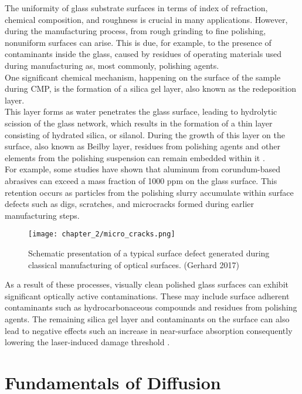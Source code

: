 The uniformity of glass substrate surfaces in terms of index of refraction, chemical composition, and roughness is crucial in many applications. However, during the manufacturing process, from rough grinding to fine polishing, nonuniform surfaces can arise. This is due, for example, to the presence of contaminants inside the glass, caused by residues of operating materials used during manufacturing as, most commonly, polishing agents.
\\
One significant chemical mechanism, happening on the surface of the sample during CMP, is the formation of a silica gel layer, also known as the redeposition layer.
\\
This layer forms as water penetrates the glass surface, leading to hydrolytic scission of the glass network, which results in the formation of a thin layer consisting of hydrated silica, or silanol. During the growth of this layer on the surface, also known as Beilby layer, residues from polishing agents and other elements from the polishing suspension can remain embedded within it \cite{suratwalaChemistryFormationBeilby2015}.
\\
For example, some studies \cite{kozlowskiDepthProfilingPolishinginduced1998} have shown that aluminum from corundum-based abrasives can exceed a mass fraction of 1000 ppm on the glass surface. This retention occurs as particles from the polishing slurry accumulate within surface defects such as digs, scratches, and microcracks formed during earlier manufacturing steps.

\begin{figure}[H]
    \centering
    \texttt{[image: chapter\_2/micro\_cracks.png]}
    \caption[Schematic of a surface defect generated during optics manufacturing.]{ Schematic presentation of a typical surface defect generated
during classical manufacturing of optical surfaces. (Gerhard 2017)}
    \label{fig:micro_cracks}
\end{figure}
As a result of these processes, visually clean polished glass surfaces can exhibit significant optically active contaminations. These may include surface adherent contaminants such as hydrocarbonaceous compounds and residues from polishing agents. The remaining silica gel layer and contaminants on the surface can also lead to negative effects such an increase in near-surface absorption consequently lowering the laser-induced damage threshold \cite{neauportPolishinginducedContaminationFused2005}.

\section{Fundamentals of Diffusion}
\label{subsec:diff}

